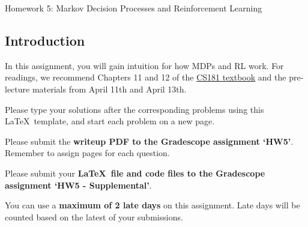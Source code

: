 \documentclass[submit]{harvardml}
\begin{document}
\begin{center}
{\Large Homework 5: Markov Decision Processes and Reinforcement Learning}\\
\end{center}

\subsection*{Introduction}

In this assignment, you will gain intuition for how MDPs and RL work.  For readings, we recommend Chapters 11 and 12 of the \href{https://github.com/harvard-ml-courses/cs181-textbook/blob/master/Textbook.pdf}{CS181 textbook} and the pre-lecture materials from April 11th and April 13th.

Please type your solutions after the corresponding problems using this
\LaTeX\ template, and start each problem on a new page.

Please submit the \textbf{writeup PDF to the Gradescope assignment `HW5'}. Remember to assign pages for each question.

Please submit your \textbf{\LaTeX\ file and code files to the Gradescope assignment `HW5 - Supplemental'}. 

You can use a \textbf{maximum of 2 late days} on this assignment.  Late days will be counted based on the latest of your submissions. 
\\
\end{document}

